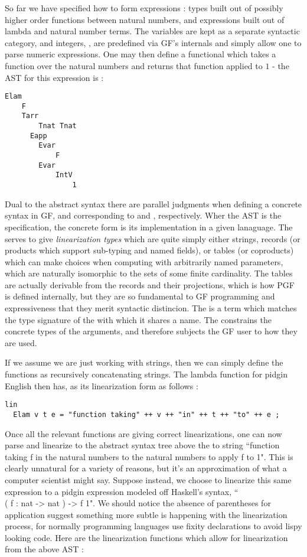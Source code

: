 So far we have specified how to form expressions : types built out of
possibly higher order functions
between natural numbers, and expressions built out of lambda and
natural number terms. The variables are kept as a separate syntactic category,
and integers, , are predefined via GF's internals and simply allow one
to parse numeric expressions. One may then define a functional which takes a
function over the natural numbers and returns that function applied to $1$ - the
AST for this expression is :

\begin{verbatim} 
Elam
    F
    Tarr
        Tnat Tnat
      Eapp
        Evar
            F
        Evar
            IntV
                1
\end{verbatim} 

Dual to the abstract syntax there are parallel judgments when defining a concrete
syntax in GF,  and  corresponding to  and
, respectively. Wher the AST is the specification, the concrete
form is its implementation in a given lanaguage. The  serves to
give \emph{linearization types} which are quite simply either strings, records (or products
which support sub-typing and named fields), or tables (or coproducts) which can
make choices when computing with arbitrarily named parameters, which are
naturally isomorphic to the sets of some finite cardinality. The tables are
actually derivable from the records and their projections, which is how PGF is
defined internally, but they are so fundamental to GF programming and
expressiveness that they merit syntactic distincion.  The 
is a term which matches the type signature of the  with which it
shares a name. The  constrains the concrete types of the arguments,
and therefore subjects the GF user to how they are used. 

If we assume we are just working with strings, then we can simply define the
functions as recursively concatenating \term{++} strings. The lambda function
for pidgin English then has, as its linearization form as follows :

\begin{verbatim}
lin 
  Elam v t e = "function taking" ++ v ++ "in" ++ t ++ "to" ++ e ;
\end{verbatim}

Once all the relevant functions are giving correct linearizations, one can now
parse and linearize to the abstract syntax tree above the to string ``function
taking f in the natural numbers to the natural numbers to apply f to 1". This is
clearly unnatural for a variety of reasons, but it's an approximation of what
a computer scientist might say. Suppose instead, we choose to linearize this same
expression to a pidgin expression modeled off Haskell's syntax, ``\\ ( f
: nat -> nat ) -> f 1". We should notice the absence of parentheses for
application suggest something more subtle is happening with the linearization
process, for normally programming languages use fixity declarations to avoid
lispy looking code. Here are the linearization functions which allow for
linearization from the above AST :

